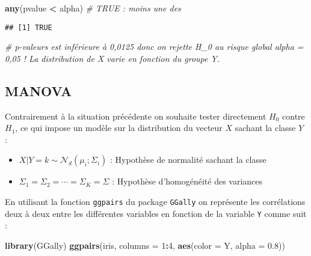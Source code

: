 \documentclass[
]{article}
\newenvironment{Shaded}{\begin{snugshade}}{\end{snugshade}}
\newcommand{\CommentTok}[1]{\textcolor[rgb]{0.56,0.35,0.01}{\textit{#1}}}
\newcommand{\DataTypeTok}[1]{\textcolor[rgb]{0.13,0.29,0.53}{#1}}
\newcommand{\DecValTok}[1]{\textcolor[rgb]{0.00,0.00,0.81}{#1}}
\newcommand{\FloatTok}[1]{\textcolor[rgb]{0.00,0.00,0.81}{#1}}
\newcommand{\KeywordTok}[1]{\textcolor[rgb]{0.13,0.29,0.53}{\textbf{#1}}}
\newcommand{\NormalTok}[1]{#1}
\newcommand{\OperatorTok}[1]{\textcolor[rgb]{0.81,0.36,0.00}{\textbf{#1}}}
\newcommand{\StringTok}[1]{\textcolor[rgb]{0.31,0.60,0.02}{#1}}
\providecommand{\tightlist}{%
  \setlength{\itemsep}{0pt}\setlength{\parskip}{0pt}}
\begin{document}
\begin{Shaded}
\begin{Highlighting}[]
\KeywordTok{any}\NormalTok{(pvalue }\OperatorTok{<}\StringTok{ }\NormalTok{alpha) }\CommentTok{# TRUE : moins une des }
\end{Highlighting}
\end{Shaded}

\begin{verbatim}
## [1] TRUE
\end{verbatim}

\begin{Shaded}
\begin{Highlighting}[]
\CommentTok{# p-valeurs est inférieure à 0,0125 donc on rejette H_0 au risque global alpha = 0,05 ! La distribution de X varie en fonction du groupe Y.}
\end{Highlighting}
\end{Shaded}

\hypertarget{manova}{%
\subsection{MANOVA}\label{manova}}

Contrairement à la situation précédente on souhaite tester directement
\(H_0\) contre \(H_1\), ce qui impose un modèle sur la distribution du
vecteur \(X\) sachant la classe \(Y\) :

\begin{itemize}
\tightlist
\item
  \(X | Y = k \sim \mathcal{N}_d(\mu_i;\Sigma_i)\) : Hypothèse de
  normalité sachant la classe
\item
  \(\Sigma_1 = \Sigma_2 = \cdots = \Sigma_K = \Sigma\) : Hypothèse
  d'homogénéité des variances
\end{itemize}

En utilisant la fonction \texttt{ggpairs} du package \texttt{GGally} on
représente les corrélations deux à deux entre les différentes variables
en fonction de la variable \texttt{Y} comme suit :

\begin{Shaded}
\begin{Highlighting}[]
\KeywordTok{library}\NormalTok{(GGally)}
\KeywordTok{ggpairs}\NormalTok{(iris, }\DataTypeTok{columns =} \DecValTok{1}\OperatorTok{:}\DecValTok{4}\NormalTok{, }\KeywordTok{aes}\NormalTok{(}\DataTypeTok{color =}\NormalTok{ Y, }\DataTypeTok{alpha =} \FloatTok{0.8}\NormalTok{))}
\end{Highlighting}
\end{Shaded}
\end{document}

